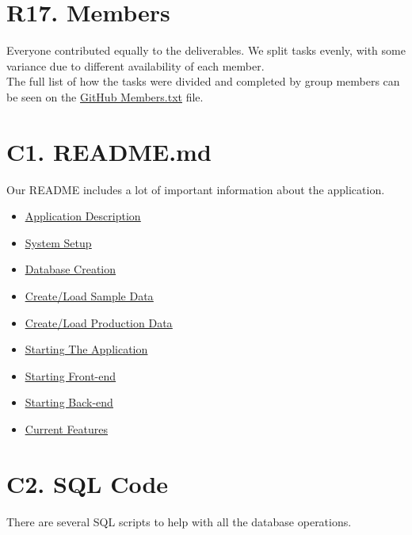 \documentclass[12pt, a4paper]{article}
\begin{document}
\section*{R17. Members}
Everyone contributed equally to the deliverables. We split tasks evenly, with some variance due to different availability of each member.\\

The full list of how the tasks were divided and completed by group members can be seen on the \underline{\href{https://github.com/Kggupta/DegreeMap/blob/main/Members.txt}{GitHub Members.txt}} file.
\section*{C1. README.md}
Our README includes a lot of important information about the application.
\begin{itemize}
    \item \underline{\href{https://github.com/Kggupta/DegreeMap\#degreemap}{Application Description}}
    \item \underline{\href{https://github.com/Kggupta/DegreeMap\#2-create-a-local-instance-of-the-database}{System Setup}}
    \item \underline{\href{https://github.com/Kggupta/DegreeMap\#3-populate-database}{Database Creation}}
    \item \underline{\href{https://github.com/Kggupta/DegreeMap\#31-sample}{Create/Load Sample Data}}
    \item \underline{\href{https://github.com/Kggupta/DegreeMap\#32-production}{Create/Load Production Data}}
    \item \underline{\href{https://github.com/Kggupta/DegreeMap\#4-running-the-application}{Starting The Application}}
    \item \underline{\href{https://github.com/Kggupta/DegreeMap\#41-running-the-client}{Starting Front-end}}
    \item \underline{\href{https://github.com/Kggupta/DegreeMap\#42-running-the-server}{Starting Back-end}}
    \item \underline{\href{https://github.com/Kggupta/DegreeMap\#5-current-features}{Current Features}}
\end{itemize}


\section*{C2. SQL Code}
There are several SQL scripts to help with all the database operations.
\end{document}
